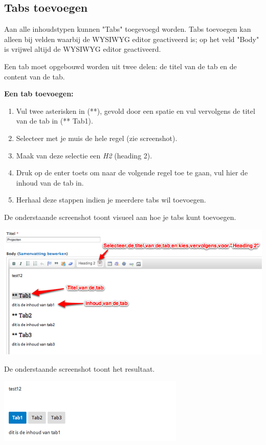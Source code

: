 \subsection{Tabs toevoegen}\label{tabstoevoegen}
Aan alle inhoudstypen kunnen "Tabs" toegevoegd worden. 
Tabs toevoegen kan alleen bij velden waarbij de WYSIWYG  editor geactiveerd is; op het veld "Body" is vrijwel altijd de WYSIWYG editor geactiveerd.

Een tab moet opgebouwd worden uit twee delen: de titel van de tab en de content van de tab.

\textbf{Een tab toevoegen:} 

\begin{enumerate}
\item Vul twee asterisken in (**), gevold door een spatie en vul vervolgens de titel van de tab in (** Tab1).
\item Selecteer met je muis de hele regel (zie screenshot).
\item Maak van deze selectie een \emph{H2} (heading 2).
\item Druk op de enter toets om naar de volgende regel toe te gaan, vul hier de inhoud van de tab in.
\item Herhaal deze stappen indien je meerdere tabs wil toevoegen.
\end{enumerate}

De onderstaande screenshot toont visueel aan hoe je tabs kunt toevoegen.

\begin{center}
	\includegraphics[width=\textwidth]{img/tabs1}
\end{center}

De onderstaande screenshot toont het resultaat.

\begin{center}
	\includegraphics[width=\textwidth]{img/tabs2}
\end{center}